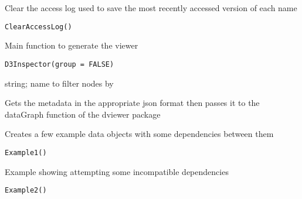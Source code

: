 \documentclass[a4paper]{book}
\begin{document}
%
\begin{Description}\relax
Clear the access log used to save the most recently accessed version of each name
\end{Description}
%
\begin{Usage}
\begin{verbatim}
ClearAccessLog()
\end{verbatim}
\end{Usage}
%
\begin{Description}\relax
Main function to generate the viewer
\end{Description}
%
\begin{Usage}
\begin{verbatim}
D3Inspector(group = FALSE)
\end{verbatim}
\end{Usage}
%
\begin{Arguments}
\begin{ldescription}
\item[\code{group}] string; name to filter nodes by
\end{ldescription}
\end{Arguments}
%
\begin{Details}\relax
Gets the metadata in the appropriate json format then passes it to the dataGraph function of the dviewer package
\end{Details}
%
\begin{Description}\relax
Creates a few example data objects with some dependencies between them
\end{Description}
%
\begin{Usage}
\begin{verbatim}
Example1()
\end{verbatim}
\end{Usage}
%
\begin{Description}\relax
Example showing attempting some incompatible dependencies
\end{Description}
%
\begin{Usage}
\begin{verbatim}
Example2()
\end{verbatim}
\end{Usage}
\end{document}
